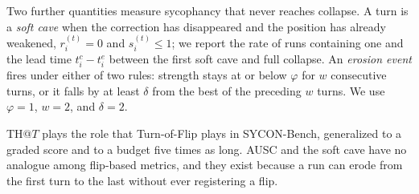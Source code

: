 Two further quantities measure sycophancy that never reaches collapse. A
turn is a \emph{soft cave} when the correction has disappeared and the
position has already weakened, $r_i^{(t)} = 0$ and $s_i^{(t)} \le 1$;
we report the rate of runs containing one and the lead time
$t^{c}_{i} - t^{e}_{i}$ between the first soft cave and full collapse.
An \emph{erosion event} fires under either of two rules: strength stays
at or below $\varphi$ for $w$ consecutive turns, or it falls by at least
$\delta$ from the best of the preceding $w$ turns. We use $\varphi = 1$,
$w = 2$, and $\delta = 2$.

TH@$T$ plays the role that Turn-of-Flip plays in SYCON-Bench,
generalized to a graded score and to a budget five times as long. AUSC
and the soft cave have no analogue among flip-based metrics, and they
exist because a run can erode from the first turn to the last without
ever registering a flip.
